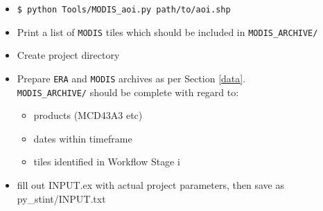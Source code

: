 \documentclass[twoside,a4paper]{refart}
\begin{document}
\begin{itemize}\item
    \texttt{\$ python Tools/MODIS\_aoi.py path/to/aoi.shp}
    
    \item
        Print a list of \texttt{MODIS} tiles which should be included in 
        \texttt{MODIS\_ARCHIVE/}
    
    \item
        Create project directory
    \item
        Prepare \texttt{ERA} and \texttt{MODIS} archives 
        as per Section \ref{data}.  \\
        \texttt{MODIS\_ARCHIVE/} should be complete
        with regard to:
        \begin{itemize}
        \item
            products (MCD43A3 etc)
        \item
            dates within timeframe
        \item
            tiles identified in Workflow Stage i
        \end{itemize}
    \item
        fill out INPUT.ex with actual project parameters, 
        then save as py\_stint/INPUT.txt
\end{itemize}
\end{document}
